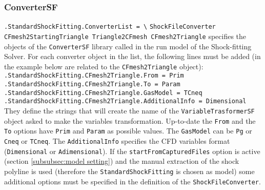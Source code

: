 \documentclass[11pt,a4paper,oneside]{article}
\begin{document}
\subsubsection{ConverterSF}
\label{subsubsec:converter}

\hspace*{1cm} \texttt{.StandardShockFitting.ConverterList = \textbackslash{}}
\newline
\hspace*{1.3cm} \texttt{ShockFileConverter CFmesh2StartingTriangle Triangle2CFmesh CFmesh2Triangle}
\newline
\newline
specifies the objects of the \texttt{ConverterSF} library called in the run model of the Shock-fitting Solver. 
\newline
For each converter object in the list, the following lines must be added (in the example below are related to the \texttt{CFmesh2Triangle} object):
\newline
\newline
\hspace*{1cm} \texttt{.StandardShockFitting.CFmesh2Triangle.From = Prim}
\newline
\hspace*{1cm} \texttt{.StandardShockFitting.CFmesh2Triangle.To = Param}
\newline
\hspace*{1cm} \texttt{.StandardShockFitting.CFmesh2Triangle.GasModel = TCneq}
\newline
\hspace*{1cm} \texttt{.StandardShockFitting.CFmesh2Triangle.AdditionalInfo = Dimensional}
\newline
\newline
They define the strings that will create the name of the \texttt{VariableTrasformerSF} object asked to make the variables transformation. 
\newline
\newline
Up-to-date the \texttt{From} and the \texttt{To} options have \texttt{Prim} and \texttt{Param} as possible values. 
\newline
The \texttt{GasModel} can be \texttt{Pg} or \texttt{Cneq} or \texttt{TCneq}. 
\newline
The \texttt{AdditionalInfo} specifies the CFD variables format (\texttt{Dimensional} or \texttt{Adimensional}).
\newline
\newline
If the \texttt{startFromCapturedFiles} option is active (section \ref{subsubsec:model setting}) and the manual extraction of the shock polyline is used (therefore the \texttt{StandardShockFitting} is chosen as model) some additional options must be specified in the definition of the \texttt{ShockFileConverter}.
\end{document}
